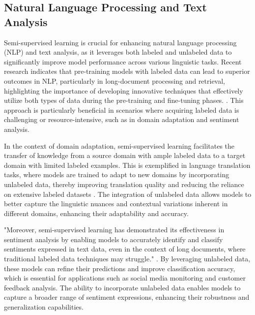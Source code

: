
\subsection{Natural Language Processing and Text Analysis} \label{subsec:Natural Language Processing and Text Analysis}

Semi-supervised learning is crucial for enhancing natural language processing (NLP) and text analysis, as it leverages both labeled and unlabeled data to significantly improve model performance across various linguistic tasks. Recent research indicates that pre-training models with labeled data can lead to superior outcomes in NLP, particularly in long-document processing and retrieval, highlighting the importance of developing innovative techniques that effectively utilize both types of data during the pre-training and fine-tuning phases. \cite{ginzburg2021selfsuperviseddocumentsimilarityranking,tang2023mvpmultitasksupervisedpretraining}. This approach is particularly beneficial in scenarios where acquiring labeled data is challenging or resource-intensive, such as in domain adaptation and sentiment analysis.



In the context of domain adaptation, semi-supervised learning facilitates the transfer of knowledge from a source domain with ample labeled data to a target domain with limited labeled examples. This is exemplified in language translation tasks, where models are trained to adapt to new domains by incorporating unlabeled data, thereby improving translation quality and reducing the reliance on extensive labeled datasets \cite{bogoychev2020domaintranslationesenoisesynthetic}. The integration of unlabeled data allows models to better capture the linguistic nuances and contextual variations inherent in different domains, enhancing their adaptability and accuracy.



"Moreover, semi-supervised learning has demonstrated its effectiveness in sentiment analysis by enabling models to accurately identify and classify sentiments expressed in text data, even in the context of long documents, where traditional labeled data techniques may struggle." \cite{ginzburg2021selfsuperviseddocumentsimilarityranking}. By leveraging unlabeled data, these models can refine their predictions and improve classification accuracy, which is essential for applications such as social media monitoring and customer feedback analysis. The ability to incorporate unlabeled data enables models to capture a broader range of sentiment expressions, enhancing their robustness and generalization capabilities.



